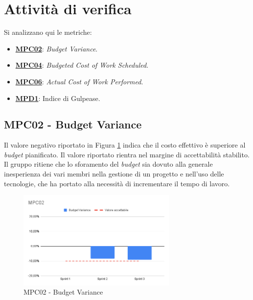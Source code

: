 \section{Attività di verifica}
Si analizzano qui le metriche:
\begin{itemize}
    \item \hyperref[s:mpc02]{\textbf{MPC02}}\textbf{}: \textit{Budget Variance}.
    \item \hyperref[s:mpc04]{\textbf{MPC04}}\textbf{}: \textit{Budgeted Cost of Work Scheduled}.
    \item \hyperref[s:mpc06]{\textbf{MPC06}}\textbf{}: \textit{Actual Cost of Work Performed}.
    \item \hyperref[s:mpd1]{\textbf{MPD1}}\textbf{}: Indice di Gulpease.
\end{itemize}

\subsection{MPC02 - Budget Variance}
\label{s:mpc02}
Il valore negativo riportato in Figura \ref{fig:mpc02} indica che il costo effettivo è superiore al \textit{budget} pianificato.
Il valore riportato rientra nel margine di accettabilità stabilito. \\
Il gruppo ritiene che lo sforamento del \textit{budget} sia dovuto alla generale inesperienza dei vari membri nella gestione di un progetto e nell'uso delle tecnologie, che ha portato alla necessità di incrementare il tempo di lavoro.

\begin{figure}[htbp]
    \centering
    \includegraphics[width=0.7\textwidth]{img/MPC02.png}
    \caption{MPC02 - Budget Variance}
    \label{fig:mpc02}
\end{figure}


\newpage
